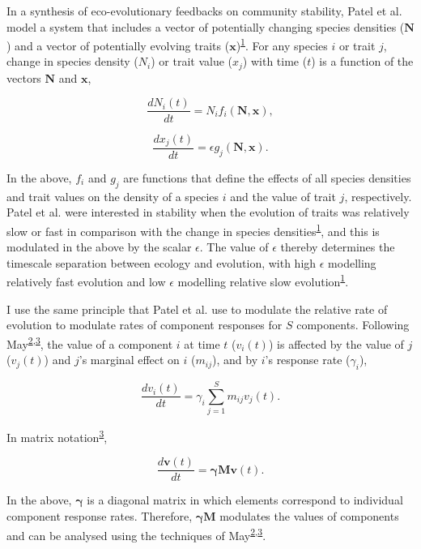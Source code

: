 \documentclass[]{article}
\begin{document}
In a synthesis of eco-evolutionary feedbacks on community stability,
Patel et al. model a system that includes a vector of potentially
changing species densities (\(\mathbf{N}\)) and a vector of potentially
evolving traits
(\(\mathbf{x}\))\textsuperscript{\protect\hyperlink{ref-Patel2018}{1}}.
For any species \(i\) or trait \(j\), change in species density
(\(N_{i}\)) or trait value (\(x_{j}\)) with time (\(t\)) is a function
of the vectors \(\mathbf{N}\) and \(\mathbf{x}\),

\[\frac{dN_{i}(t)}{dt} = N_{i}f_{i}(\mathbf{N}, \mathbf{x}),\]

\[\frac{dx_{j}(t)}{dt} = \epsilon g_{j}(\mathbf{N}, \mathbf{x}).\]

In the above, \(f_{i}\) and \(g_{j}\) are functions that define the
effects of all species densities and trait values on the density of a
species \(i\) and the value of trait \(j\), respectively. Patel et al.
were interested in stability when the evolution of traits was relatively
slow or fast in comparison with the change in species
densities\textsuperscript{\protect\hyperlink{ref-Patel2018}{1}}, and
this is modulated in the above by the scalar \(\epsilon\). The value of
\(\epsilon\) thereby determines the timescale separation between ecology
and evolution, with high \(\epsilon\) modelling relatively fast
evolution and low \(\epsilon\) modelling relative slow
evolution\textsuperscript{\protect\hyperlink{ref-Patel2018}{1}}.

I use the same principle that Patel et al. use to modulate the relative
rate of evolution to modulate rates of component responses for \(S\)
components. Following
May\textsuperscript{\protect\hyperlink{ref-May1972}{2},\protect\hyperlink{ref-May1973}{3}},
the value of a component \(i\) at time \(t\) (\(v_{i}(t)\)) is affected
by the value of \(j\) (\(v_{j}(t)\)) and \(j\)'s marginal effect on
\(i\) (\(m_{ij}\)), and by \(i\)'s response rate (\(\gamma_{i}\)),

\[\frac{dv_{i}(t)}{dt} = \gamma_{i} \sum_{j=1}^{S}m_{ij}v_{j}(t).\]

In matrix notation\textsuperscript{\protect\hyperlink{ref-May1973}{3}},

\[\frac{d\mathbf{v}(t)}{dt} = \mathbf{\gamma} \mathbf{M}\mathbf{v}(t).\]

In the above, \(\mathbf{\gamma}\) is a diagonal matrix in which elements
correspond to individual component response rates. Therefore,
\(\mathbf{\gamma} \mathbf{M}\) modulates the values of components and
can be analysed using the techniques of
May\textsuperscript{\protect\hyperlink{ref-May1972}{2},\protect\hyperlink{ref-May1973}{3}}.
\end{document}
